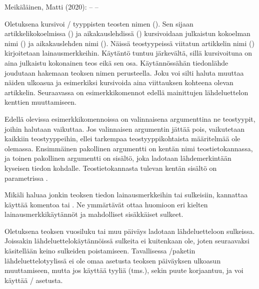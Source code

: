 \begin{tulossis}
  Meikäläinen, Matti (2020): -- --
\end{tulossis}

\noindent
Oletuksena  kursivoi \-/ tyyppisten
teosten nimen (). Sen sijaan artikkelikokoelmissa
() ja aikakauslehdissä ()
kursivoidaan julkaistun kokoelman nimi () ja
aikakauslehden nimi (). Näissä teostyypeissä
viitatun artikkelin nimi () kirjoitetaan lainausmerkkeihin.
Käytäntö tuntuu järkevältä, sillä kursivoituna on aina julkaistu
kokonainen teos eikä sen osa. Käytännössähän tiedonlähde joudutaan
hakemaan teoksen nimen perusteella. Joku voi silti haluta muuttaa näiden
ulkoasua ja esimerkiksi kursivoida aina viittauksen kohteena olevan
artikkelin. Seuraavassa on esimerkkikomennot edellä mainittujen
lähdeluettelon kenttien muuttamiseen.

\begin{koodilohkosis}
\end{koodilohkosis}

\noindent
Edellä olevissa esimerkkikomennoissa on valinnaisena argumenttina ne
teostyypit, joihin halutaan vaikuttaa. Jos valinnaisen argumentin jättää
pois, vaikutetaan kaikkiin teostyyppeihin, ellei tarkempaa
teostyyppikohtaista määritelmää ole olemassa. Ensimmäinen pakollinen
argumentti on kentän nimi teostietokannassa, ja toinen pakollinen
argumentti on sisältö, joka ladotaan lähdemerkintään kyseisen tiedon
kohdalle. Teostietokannasta tulevan kentän sisältö on parametrissa
.

Mikäli haluaa jonkin teoksen tiedon lainausmerkkeihin tai sulkeisiin,
kannattaa käyttää komentoa  tai
. Ne ymmärtävät ottaa huomioon eri kielten
lainausmerkkikäytännöt ja mahdolliset sisäkkäiset sulkeet.

\begin{koodilohkosis}
\end{koodilohkosis}

\noindent
Oletuksena teoksen vuosiluku tai muu päiväys ladotaan lähdeluetteloon
sulkeissa. Joissakin lähdeluettelokäytännöissä sulkeita ei kuitenkaan
ole, joten seuraavaksi käsitellään keino sulkeiden poistamiseen.
Tavallisessa \-/paketin lähdeluettelotyylissä
 ei ole omaa asetusta teoksen päiväyksen ulkoasun
muuttamiseen, mutta jos käyttää tyyliä  (tms.),
sekin puute korjaantuu, ja voi käyttää \-/
asetusta.

